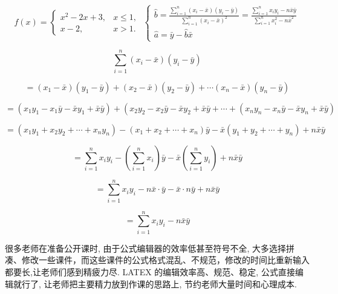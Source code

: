 \documentclass[10pt]{article}
\begin{document}
\[
f\left( x\right)  = \left\{  \begin{array}{ll} {x}^{2} - {2x} + 3, & x \leq  1, \\  x - 2, & x > 1. \end{array}\right. \;\left\{  \begin{array}{l} \widehat{b} = \frac{\mathop{\sum }\limits_{{i = 1}}^{n}\left( {{x}_{i} - \bar{x}}\right) \left( {{y}_{i} - \bar{y}}\right) }{\mathop{\sum }\limits_{{i = 1}}^{n}{\left( {x}_{i} - \bar{x}\right) }^{2}} = \frac{\mathop{\sum }\limits_{{i = 1}}^{n}{x}_{i}{y}_{i} - n\bar{x}\bar{y}}{\mathop{\sum }\limits_{{i = 1}}^{n}{x}_{i}^{2} - n{\bar{x}}^{2}} \\  \widehat{a} = \bar{y} - \widehat{b}\bar{x} \end{array}\right.
\]

\[
\mathop{\sum }\limits_{{i = 1}}^{n}\left( {{x}_{i} - \bar{x}}\right) \left( {{y}_{i} - \bar{y}}\right)
\]

\[
= \left( {{x}_{1} - \bar{x}}\right) \left( {{y}_{1} - \bar{y}}\right)  + \left( {{x}_{2} - \bar{x}}\right) \left( {{y}_{2} - \bar{y}}\right)  + \cdots \left( {{x}_{n} - \bar{x}}\right) \left( {{y}_{n} - \bar{y}}\right)
\]

\[
= \left( {{x}_{1}{y}_{1} - {x}_{1}\bar{y} - \bar{x}{y}_{1} + \bar{x}\bar{y}}\right)  + \left( {{x}_{2}{y}_{2} - {x}_{2}\bar{y} - \bar{x}{y}_{2} + \bar{x}\bar{y} + \cdots  + \left( {{x}_{n}{y}_{n} - {x}_{n}\bar{y} - \bar{x}{y}_{n} + \bar{x}\bar{y}}\right) }\right.
\]

\[
= \left( {{x}_{1}{y}_{1} + {x}_{2}{y}_{2} + \cdots  + {x}_{n}{y}_{n}}\right)  - \left( {{x}_{1} + {x}_{2} + \cdots  + {x}_{n}}\right) \bar{y} - \bar{x}\left( {{y}_{1} + {y}_{2} + \cdots  + {y}_{n}}\right)  + n\bar{x}\bar{y}
\]

\[
= \mathop{\sum }\limits_{{i = 1}}^{n}{x}_{i}{y}_{i} - \left( {\mathop{\sum }\limits_{{i = 1}}^{n}{x}_{i}}\right) \bar{y} - \bar{x}\left( {\mathop{\sum }\limits_{{i = 1}}^{n}{y}_{i}}\right)  + n\bar{x}\bar{y}
\]

\[
= \mathop{\sum }\limits_{{i = 1}}^{n}{x}_{i}{y}_{i} - n\bar{x} \cdot  \bar{y} - \bar{x} \cdot  n\bar{y} + n\bar{x}\bar{y}
\]

\[
= \mathop{\sum }\limits_{{i = 1}}^{n}{x}_{i}{y}_{i} - n\bar{x}\bar{y}
\]

很多老师在准备公开课时, 由于公式编辑器的效率低甚至符号不全, 大多选择拼凑、修改一些课件，而这些课件的公式格式混乱、不规范，修改的时间比重新输入都要长,让老师们感到精疲力尽. LATEX 的编辑效率高、规范、稳定, 公式直接编辑就行了, 让老师把主要精力放到作课的思路上, 节约老师大量时间和心理成本.
\end{document}
